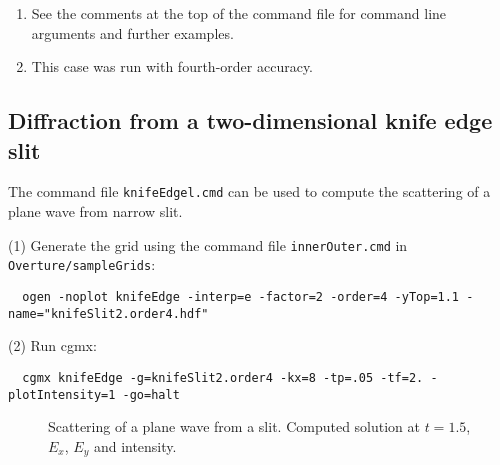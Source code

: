 \documentclass{article}
\begin{document}
\begin{enumerate}
  \item See the comments at the top of the command file for command line arguments and further examples.
  \item This case was run with fourth-order accuracy.
\end{enumerate}


\clearpage
\subsection{Diffraction from a two-dimensional knife edge slit} \label{sec:knifeEdge2d}

The command file {\tt knifeEdgel.cmd} can be used to compute the scattering
of a plane wave from narrow slit.

\noindent (1) Generate the grid using the command file {\tt innerOuter.cmd} in {\tt Overture/sampleGrids}:
{\small
\begin{verbatim}
  ogen -noplot knifeEdge -interp=e -factor=2 -order=4 -yTop=1.1 -name="knifeSlit2.order4.hdf"
\end{verbatim}
}
\noindent (2) Run cgmx: 
\begin{verbatim}
  cgmx knifeEdge -g=knifeSlit2.order4 -kx=8 -tp=.05 -tf=2. -plotIntensity=1 -go=halt
\end{verbatim}

{
\begin{figure}[hbt]
\newcommand{\figWidth}{5.5cm}
\newcommand{\trimfig}[2]{\trimFig{#1}{#2}{0.1}{0.05}{.05}{.05}}
\begin{center}
\end{center}
\caption{Scattering of a plane wave from a slit. Computed solution at $t=1.5$, $E_x$, $E_y$ and intensity.}
\label{fig:knifeEdge2d}
\end{figure}
}
\end{document}
